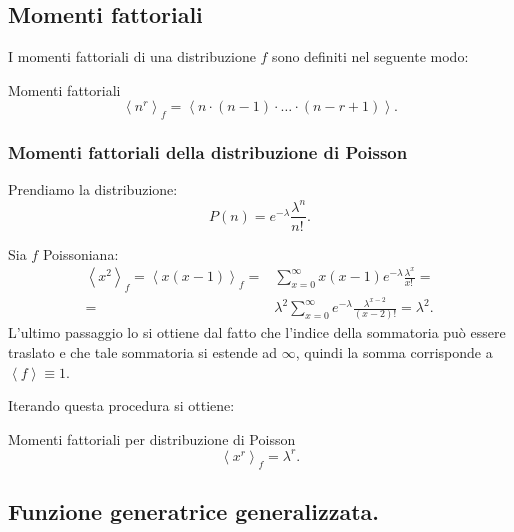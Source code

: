 \subsection{Momenti fattoriali}%
\label{sub:Momenti fattoriali}
I momenti fattoriali di una distribuzione $f$ sono definiti nel seguente modo:
\begin{redbox}{Momenti fattoriali}
    \[
	\left<n^r\right>_f = \left<n\cdot (n-1) \cdot \ldots \cdot (n-r+1) \right>
    .\] 
\end{redbox}
\noindent
\subsubsection{Momenti fattoriali della distribuzione di Poisson}%
\label{subsub:Momenti fattoriali della distribuzione di Poisson}
Prendiamo la distribuzione:
\[
	P(n) = e^{-\lambda } \frac{\lambda^n}{n!\,}
.\] 
\begin{exmp}[Poisson con $r=2$.]
    Sia $f$ Poissoniana:
   \[\begin{aligned}
       \left<x^2\right>_f=\left<x\left(x-1\right)\right>_f =& \sum_{x = 0}^{\infty} x\left(x-1\right)e^{-\lambda} \frac{\lambda^x}{x!\,} = \\
       =& \lambda^2 \sum_{x = 0}^{\infty}  e^{-\lambda} \frac{\lambda^{x-2}}{\left(x-2\right)!} = \lambda^2
   .\end{aligned}\]
   L'ultimo passaggio lo si ottiene dal fatto che l'indice della sommatoria può essere traslato e che tale sommatoria si estende ad $\infty$, quindi la somma corrisponde a $\left<f\right> \equiv 1$.
\end{exmp}
\noindent
Iterando questa procedura si ottiene:
\begin{bluebox}{Momenti fattoriali per distribuzione di Poisson}
 \[
    \left<x^r\right>_f = \lambda^r
.\]    
\end{bluebox}
\noindent

\subsection{Funzione generatrice generalizzata.}%
\label{subsub:Funzione generatrice generalizzata.}

